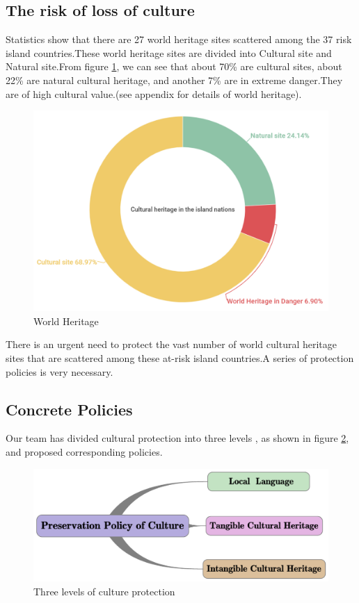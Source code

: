 \documentclass[12pt]{article}  %
\begin{document}
\subsection{The risk of loss of culture}
Statistics show that there are 27 world heritage sites scattered among the 37 risk island countries.These world heritage sites are divided into Cultural site and Natural site.From figure \ref{culture site}, we can see that about 70\% are cultural sites, about 22\% are natural cultural heritage, and another 7\% are in extreme danger.They are of high cultural value.(see appendix for details of world heritage).

\begin{figure}[htbp]
	\centering
	\includegraphics[width=.8\textwidth]{culture site.png}
	\caption{ World Heritage}\label{culture site}
\end{figure}

There is an urgent need to protect the vast number of world cultural heritage sites that are scattered among these at-risk island countries.A series of protection policies is very necessary.



\subsection{Concrete Policies}
Our team has divided cultural protection into three levels , as shown in figure \ref{culture 3 levels}, and proposed corresponding policies.

\begin{figure}[htbp]
	\centering
	\includegraphics[width=.8\textwidth]{culture 3 levels.png}
	\caption{ Three levels of culture protection }\label{culture 3 levels}
\end{figure}
\end{document}
